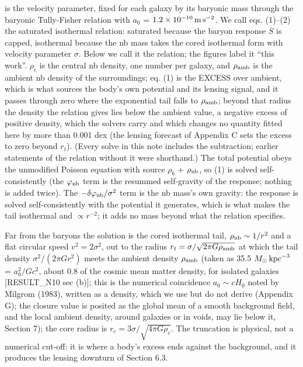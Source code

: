 \documentclass[
  10pt,
]{article}
\begin{document}
is the velocity parameter, fixed for each galaxy by its baryonic mass through the baryonic Tully-Fisher relation with $a_0$ = $1.2\times10^{-10}\,{\rm m\,s^{-2}}$. We call eqs. (1)--(2) the saturated isothermal relation: saturated because the baryon response $S$ is capped, isothermal because the nb mass takes the cored isothermal form with velocity parameter $\sigma$. Below we call it the relation; the figures label it ``this work''. $\rho_c$ is the central nb density, one number per galaxy, and $\rho_{\rm amb}$ is the ambient nb density of the surroundings; eq. (1) is the EXCESS over ambient, which is what sources the body's own potential and its lensing signal, and it passes through zero where the exponential tail falls to $\rho_{\rm amb}$; beyond that radius the density the relation gives lies below the ambient value, a negative excess of positive density, which the solvers carry and which changes no quantity fitted here by more than 0.001 dex (the lensing forecast of Appendix C sets the excess to zero beyond $r_t$). (Every solve in this note includes the subtraction; earlier statements of the relation without it were shorthand.) The total potential obeys the unmodified Poisson equation with source $\rho_b$ + $\rho_{\rm nb}$, so (1) is solved self-consistently (the $\varphi_{\rm nb}$ term is the resummed self-gravity of the response; nothing is added twice). The $-\delta\varphi_{\rm nb}/\sigma^2$ term is the nb mass's own gravity: the response is solved self-consistently with the potential it generates, which is what makes the tail isothermal and $\propto r^{-2}$; it adds no mass beyond what the relation specifies.

Far from the baryons the solution is the cored isothermal tail, $\rho_{\rm nb}\sim 1/r^2$ and a flat circular speed $v^2=2\sigma^2$, out to the radius $r_t=\sigma/\sqrt{2\pi G\rho_{\rm amb}}$ at which the tail density $\sigma^2/(2\pi G r^2)$ meets the ambient density $\rho_{\rm amb}$ (taken as 35.5 $M_\odot\,{\rm kpc}^{-3}$ = $a_0^2/Gc^2$, about 0.8 of the cosmic mean matter density, for isolated galaxies {[}RESULT\_N10 sec (b){]}; this is the numerical coincidence $a_0\sim cH_0$ noted by Milgrom (1983), written as a density, which we use but do not derive (Appendix G); the closure value is posited as the global mean of a smooth background field, and the local ambient density, around galaxies or in voids, may lie below it, Section 7); the core radius is $r_c=3\sigma/\sqrt{4\pi G\rho_c}$. The truncation is physical, not a numerical cut-off: it is where a body's excess ends against the background, and it produces the lensing downturn of Section 6.3.
\end{document}
